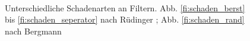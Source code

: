 \begin{figure}[H]
\begin{center}
{       }%
       \\%

%
   \end{center}
   \caption{%
       Unterschiedliche Schadenarten an Filtern. Abb. \ref{fi:schaden_berst} bis \ref{fi:schaden_seperator} nach Rüdinger \cite{rudinger}; Abb. \ref{fi:schaden_rand} nach Bergmann \cite{hepa}
    }%
  \label{fig:schadensarten}
\end{figure}
